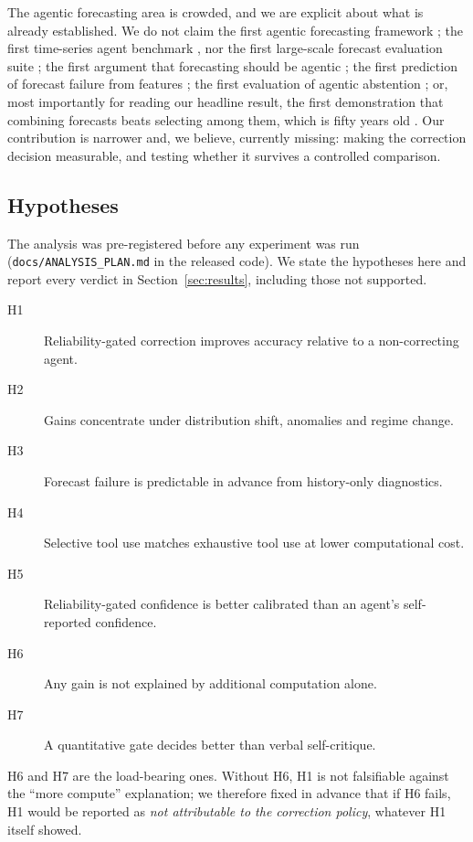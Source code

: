 The agentic forecasting area is crowded, and we are explicit about what is already
established. We do not claim the first agentic forecasting framework
\citep{tsscientist2025,nexus2026,castflow2026,tsagent2025,lastmile2026}; the first
time-series agent benchmark
\citep{temporalbench2026,timesagemt2026,timeseriesgym2025,aion2026}, nor the first
large-scale forecast evaluation suite \citep{gifteval2024,monash2021}; the first argument
that forecasting should be agentic \citep{position2026}; the first prediction of
forecast failure from features \citep{fformpp2019,mast2025}; the first evaluation of
agentic abstention \citep{agentabstain2026}; or, most importantly for reading our
headline result, the first demonstration that combining forecasts beats selecting
among them, which is fifty years old \citep{bates1969,clemen1989,wang2023review}. Our
contribution is narrower and, we
believe, currently missing: making the correction decision measurable, and testing
whether it survives a controlled comparison.

\subsection{Hypotheses}

The analysis was pre-registered before any experiment was run
(\texttt{docs/ANALYSIS\_PLAN.md} in the released code). We state the hypotheses here and
report every verdict in Section~\ref{sec:results}, including those not supported.

\begin{description}
  \item[H1] Reliability-gated correction improves accuracy relative to a non-correcting
  agent.
  \item[H2] Gains concentrate under distribution shift, anomalies and regime change.
  \item[H3] Forecast failure is predictable in advance from history-only diagnostics.
  \item[H4] Selective tool use matches exhaustive tool use at lower computational cost.
  \item[H5] Reliability-gated confidence is better calibrated than an agent's
  self-reported confidence.
  \item[H6] Any gain is not explained by additional computation alone.
  \item[H7] A quantitative gate decides better than verbal self-critique.
\end{description}

H6 and H7 are the load-bearing ones. Without H6, H1 is not falsifiable against the
``more compute'' explanation; we therefore fixed in advance that if H6 fails, H1 would
be reported as \emph{not attributable to the correction policy}, whatever H1 itself
showed.
